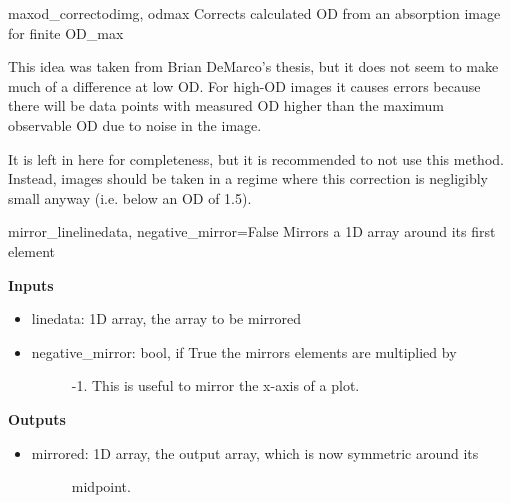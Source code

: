 \documentclass[letterpaper,10pt,english]{manual}
\begin{document}
\hypertarget{imageprocess.maxod_correct}{}\begin{funcdesc}{maxod\_correct}{odimg, odmax}
Corrects calculated OD from an absorption image for finite OD\_max

This idea was taken from Brian DeMarco's thesis, but it does not seem to
make much of a difference at low OD. For high-OD images it causes errors
because there will be data points with measured OD higher than the maximum
observable OD due to noise in the image.

It is left in here for completeness, but it is recommended to not use this
method. Instead, images should be taken in a regime where this correction
is negligibly small anyway (i.e. below an OD of 1.5).
\end{funcdesc}

\hypertarget{imageprocess.mirror_line}{}\begin{funcdesc}{mirror\_line}{linedata, negative\_mirror=False}
Mirrors a 1D array around its first element

\textbf{Inputs}
\begin{itemize}
\item {} 
linedata: 1D array, the array to be mirrored

\item {} \begin{description}
\item[negative\_mirror: bool, if True the mirrors elements are multiplied by]
-1. This is useful to mirror the x-axis of a plot.

\end{description}

\end{itemize}

\textbf{Outputs}
\begin{itemize}
\item {} \begin{description}
\item[mirrored: 1D array, the output array, which is now symmetric around its]
midpoint.

\end{description}

\end{itemize}
\end{funcdesc}
\end{document}
